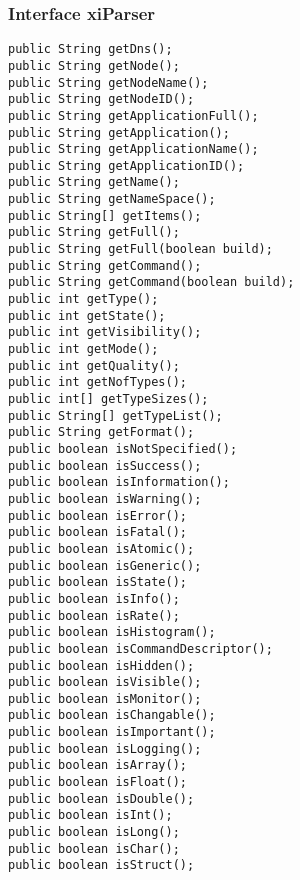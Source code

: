\subsubsection{Interface xiParser}
\begin{verbatim}
public String getDns();
public String getNode();
public String getNodeName();
public String getNodeID();
public String getApplicationFull();
public String getApplication();
public String getApplicationName();
public String getApplicationID();
public String getName();
public String getNameSpace();
public String[] getItems();
public String getFull();
public String getFull(boolean build);
public String getCommand();
public String getCommand(boolean build);
public int getType();
public int getState();
public int getVisibility();
public int getMode();
public int getQuality();
public int getNofTypes();
public int[] getTypeSizes();
public String[] getTypeList();
public String getFormat();
public boolean isNotSpecified();
public boolean isSuccess();
public boolean isInformation();
public boolean isWarning();
public boolean isError();
public boolean isFatal();
public boolean isAtomic();
public boolean isGeneric();
public boolean isState();
public boolean isInfo();
public boolean isRate();
public boolean isHistogram();
public boolean isCommandDescriptor();
public boolean isHidden();
public boolean isVisible();
public boolean isMonitor();
public boolean isChangable();
public boolean isImportant();
public boolean isLogging();
public boolean isArray();
public boolean isFloat();
public boolean isDouble();
public boolean isInt();
public boolean isLong();
public boolean isChar();
public boolean isStruct();
\end{verbatim}
